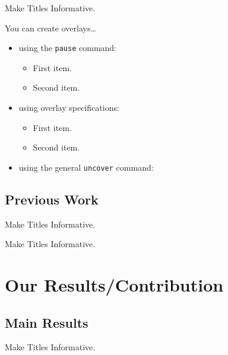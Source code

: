 \documentclass[aspectratio=169]{beamer}
\newcommand{\1}{\mathbf{1}}
\newcommand{\0}{\mathbf{0}}
\begin{document}
\begin{frame}{Make Titles Informative.}

  You can create overlays\dots
  \begin{itemize}
  \item using the \texttt{pause} command:
    \begin{itemize}
    \item
      First item.
      \pause
    \item
      Second item.
    \end{itemize}
  \item
    using overlay specifications:
    \begin{itemize}
    \item<3->
      First item.
    \item<4->
      Second item.
    \end{itemize}
  \item
    using the general \texttt{uncover} command:
    \begin{itemize}
    \end{itemize}
  \end{itemize}
\end{frame}


\subsection{Previous Work}

\begin{frame}{Make Titles Informative.}
\end{frame}

\begin{frame}{Make Titles Informative.}
\end{frame}



\section{Our Results/Contribution}

\subsection{Main Results}

\begin{frame}{Make Titles Informative.}
\end{frame}
\end{document}

